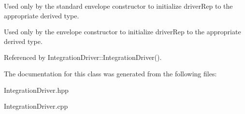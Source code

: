 Used only by the standard envelope constructor to initialize driver\+Rep to the appropriate derived type. 

Used only by the envelope constructor to initialize driver\+Rep to the appropriate derived type. 

Referenced by Integration\+Driver\+::\+Integration\+Driver().



The documentation for this class was generated from the following files\+:\begin{DoxyCompactItemize}
\item 
Integration\+Driver.\+hpp\item 
Integration\+Driver.\+cpp\end{DoxyCompactItemize}
